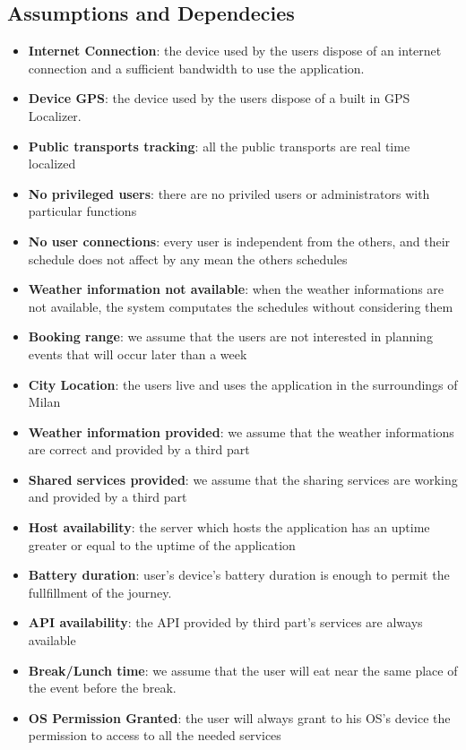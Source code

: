 \documentclass[numbers=noenddot, 12pt, a4paper, oneside]{scrbook}
\begin{document}
\subsection*{Assumptions and Dependecies}
\begin{itemize}
	\item \textbf{Internet Connection}: the device used by the users dispose of an internet connection and a sufficient bandwidth to use the application.
	\item \textbf{Device GPS}: the device used by the users dispose of a built in GPS Localizer.
	\item \textbf{Public transports tracking}: all the public transports are real time localized
	\item \textbf{No privileged users}: there are no priviled users or administrators with particular functions
	\item \textbf{No user connections}: every user is independent from the others, and their schedule does not affect by any mean the others schedules
	\item \textbf{Weather information not available}: when the weather informations are not available, the system computates the schedules without considering them
	\item \textbf{Booking range}: we assume that the users are not interested in planning events that will occur later than a week
	\item \textbf{City Location}: the users live and uses the application in the surroundings of Milan
	\item \textbf{Weather information provided}: we assume that the weather informations are correct and provided by a third part
	\item \textbf{Shared services provided}: we assume that the sharing services are working and provided by a third part
	\item \textbf{Host availability}: the server which hosts the application has an uptime greater or equal to the uptime of the application
	\item \textbf{Battery duration}: user's device's battery duration is enough to permit the fullfillment of the journey.
	\item \textbf{API availability}: the API provided by third part's services are always available
	\item \textbf{Break/Lunch time}: we assume that the user will eat near the same place of the event before the break.
	\item \textbf{OS Permission Granted}: the user will always grant to his OS's device the permission to access to all the needed services
\end{itemize}
\end{document}
